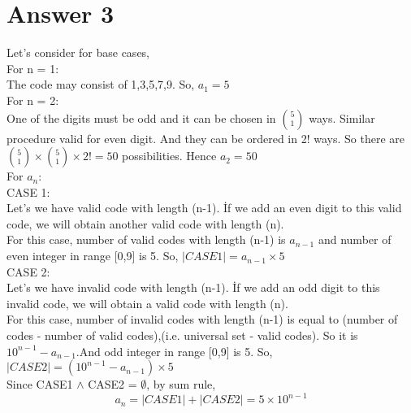 \documentclass[11pt]{article}
\begin{document}
\section*{Answer 3}
Let's consider for base cases,\\
For n = 1:\\
The code may consist of 1,3,5,7,9. So, $a_1 = 5$\\
For n = 2:\\
One of the digits must be odd and it can be chosen in $\binom{5}{1}$ ways. Similar procedure valid for even digit. And they can be ordered in 2! ways. So there are $\binom{5}{1} \times \binom{5}{1} \times 2! = 50$ possibilities. Hence $a_2 = 50$\\
For $a_n$: \\
CASE 1:\\
Let's we have valid code with length (n-1). İf we add an even digit to this valid code, we will obtain another valid code with length (n). \\
For this case, number of valid codes with length (n-1) is $a_{n-1}$ and number of even integer in range [0,9] is 5. So, $|CASE1| = a_{n-1} \times 5 $\\
CASE 2:\\
Let's we have invalid code with length (n-1). İf we add an odd digit to this invalid code, we will obtain a valid code with length (n). \\
For this case, number of invalid codes with length (n-1) is equal to (number of codes - number of valid codes),(i.e. universal set - valid codes). So it is ${10}^{n-1}-a_{n-1}$.And odd integer in range [0,9] is 5. So, $|CASE2| = ({10}^{n-1}-a_{n-1}) \times 5 $\\
Since CASE1 $\wedge$ CASE2 = $\emptyset$, by sum rule,
$$
a_n = |CASE1| + |CASE2| = 5\times{10}^{n-1}
$$
\end{document}
